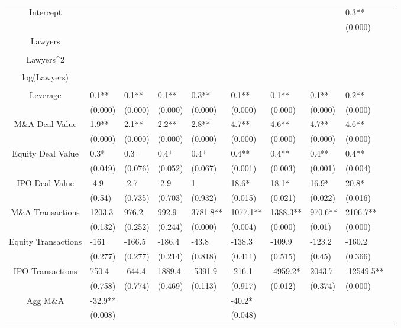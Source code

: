 \documentclass{article}
\begin{document}
\begin{table}[H]
\begin{tabular}{|clllllllll|}
Intercept &  &  &  &  &  &  &  & 0.3** & \\ 
   &  &  &  &  &  &  &  & (0.000) & \\ 
  Lawyers &  &  &  &  &  &  &  &  & \\ 
   &  &  &  &  &  &  &  &  & \\ 
  Lawyers^2 &  &  &  &  &  &  &  &  & \\ 
   &  &  &  &  &  &  &  &  & \\ 
  log(Lawyers) &  &  &  &  &  &  &  &  & \\ 
   &  &  &  &  &  &  &  &  & \\ 
  Leverage & 0.1** & 0.1** & 0.1** & 0.3** & 0.1** & 0.1** & 0.1** & 0.2** & \\ 
   & (0.000) & (0.000) & (0.000) & (0.000) & (0.000) & (0.000) & (0.000) & (0.000) & \\ 
  M\&A Deal Value & 1.9** & 2.1** & 2.2** & 2.8** & 4.7** & 4.6** & 4.7** & 4.6** & \\ 
   & (0.000) & (0.000) & (0.000) & (0.000) & (0.000) & (0.000) & (0.000) & (0.000) & \\ 
  Equity Deal Value & 0.3* & 0.3$^{+}$ & 0.4$^{+}$ & 0.4$^{+}$ & 0.4** & 0.4** & 0.4** & 0.4** & \\ 
   & (0.049) & (0.076) & (0.052) & (0.067) & (0.001) & (0.003) & (0.001) & (0.004) & \\ 
  IPO Deal Value & -4.9 & -2.7 & -2.9 & 1 & 18.6* & 18.1* & 16.9* & 20.8* & \\ 
   & (0.54) & (0.735) & (0.703) & (0.932) & (0.015) & (0.021) & (0.022) & (0.016) & \\ 
  M\&A Transactions & 1203.3 & 976.2 & 992.9 & 3781.8** & 1077.1** & 1388.3** & 970.6** & 2106.7** & \\ 
   & (0.132) & (0.252) & (0.244) & (0.000) & (0.004) & (0.000) & (0.01) & (0.000) & \\ 
  Equity Transactions & -161 & -166.5 & -186.4 & -43.8 & -138.3 & -109.9 & -123.2 & -160.2 & \\ 
   & (0.277) & (0.277) & (0.214) & (0.818) & (0.411) & (0.515) & (0.45) & (0.366) & \\ 
  IPO Transactions & 750.4 & -644.4 & 1889.4 & -5391.9 & -216.1 & -4959.2* & 2043.7 & -12549.5** & \\ 
   & (0.758) & (0.774) & (0.469) & (0.113) & (0.917) & (0.012) & (0.374) & (0.000) & \\ 
  Agg M\&A & -32.9** &  &  &  & -40.2* &  &  &  & \\ 
   & (0.008) &  &  &  & (0.048) &  &  &  & \\ 

\end{tabular}
\end{table}
\end{document}
